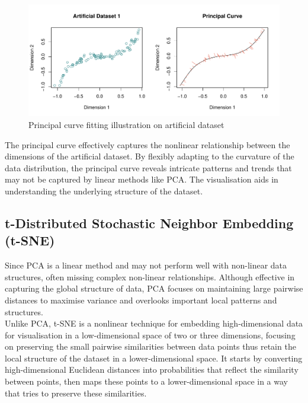 \documentclass{article}\usepackage[]{graphicx}\usepackage[]{xcolor}
\makeatletter
\def\maxwidth{ %
  \ifdim\Gin@nat@width>\linewidth
    \linewidth
  \else
    \Gin@nat@width
  \fi
}
\newenvironment{knitrout}{}{} %
\numberwithin{equation}{section}
\makeatother
\begin{document}
\begin{knitrout}\scriptsize
{}\color{fgcolor}\begin{figure}[H]

{\centering \includegraphics[width=\maxwidth]{figure/beamer-P-curves-1} 

}

\caption[Principal curve fitting illustration on artificial dataset]{Principal curve fitting illustration on artificial dataset}\label{fig:P-curves}
\end{figure}

\end{knitrout}

\noindent The principal curve effectively captures the nonlinear relationship between the dimensions of the artificial dataset. By flexibly adapting to the curvature of the data distribution, the principal curve reveals intricate patterns and trends that may not be captured by linear methods like PCA. The visualisation aids in understanding the underlying structure of the dataset.


\subsection{t-Distributed Stochastic Neighbor Embedding (t-SNE)}

Since PCA is a linear method and may not perform well with non-linear data structures, often missing complex non-linear relationships. Although effective in capturing the global structure of data, PCA focuses on maintaining large pairwise distances to maximise variance and overlooks important local patterns and structures. \\

\noindent
Unlike PCA, t-SNE \cite{vanderMaaten2008tsne} is a nonlinear technique for embedding high-dimensional data for visualisation in a low-dimensional space of two or three dimensions, focusing on preserving the small pairwise similarities between data points thus retain the local structure of the dataset in a lower-dimensional space. It starts by converting high-dimensional Euclidean distances into probabilities that reflect the similarity between points, then maps these points to a lower-dimensional space in a way that tries to preserve these similarities.
\end{document}
